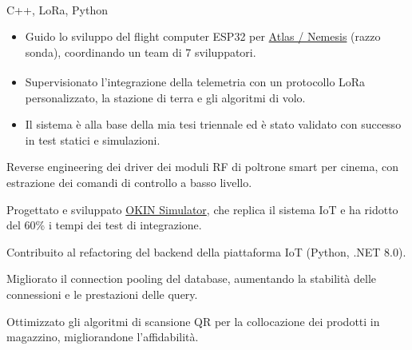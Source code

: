 \documentclass[letterpaper,11pt,italian]{article}
\begin{document}
\resumeItemListStart
{} {C++, LoRa\textsuperscript{\textcopyright}, Python}
{\begin{itemize}
    \item Guido lo sviluppo del flight computer ESP32 per \href{https://github.com/AuroraRocketryTeam/atlas}{Atlas / Nemesis} (razzo sonda), coordinando un team di 7 sviluppatori.
    \item Supervisionato l'integrazione della telemetria con un protocollo LoRa\textsuperscript{\textcopyright} personalizzato, la stazione di terra e gli algoritmi di volo.
    \item Il sistema è alla base della mia tesi triennale ed è stato validato con successo in test statici e simulazioni.
  \end{itemize}}
\resumeItemListEnd
{}
\resumeItemListStart
  \item\small{Reverse engineering dei driver dei moduli RF di poltrone smart per cinema, con estrazione dei comandi di controllo a basso livello.}
  \item\small{Progettato e sviluppato \href{https://github.com/aleemont1/OKINsimulator}{OKIN Simulator}, che replica il sistema IoT e ha ridotto del 60\% i tempi dei test di integrazione.}
  \item\small{Contribuito al refactoring del backend della piattaforma IoT (Python, .NET 8.0).}
\resumeItemListEnd


\newpage
{}
\resumeItemListStart
  \item\small{Migliorato il connection pooling del database, aumentando la stabilità delle connessioni e le prestazioni delle query.}
  \item\small{Ottimizzato gli algoritmi di scansione QR per la collocazione dei prodotti in magazzino, migliorandone l'affidabilità.}
\resumeItemListEnd
\resumeSubHeadingListEnd

\end{document}

